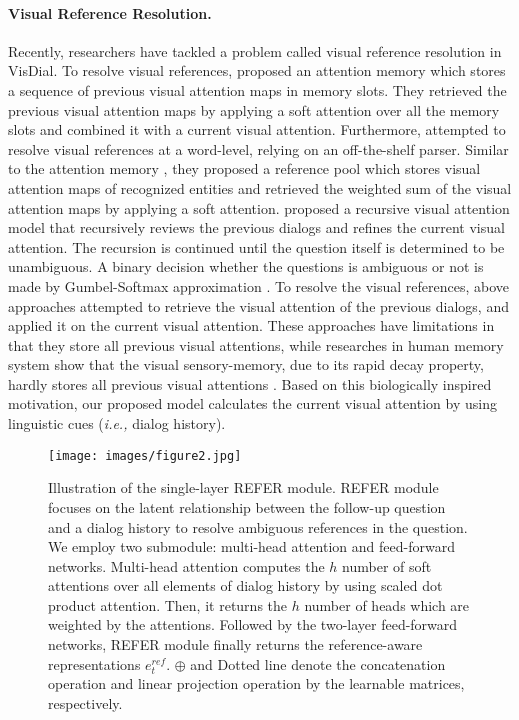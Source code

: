 \documentclass[11pt,a4paper]{article}
\begin{document}
\paragraph{Visual Reference Resolution.} Recently, researchers have tackled a problem called visual reference resolution   \cite{seo2017visual,kottur2018visual,niu2018recursive} in VisDial. To resolve visual references, \cite{seo2017visual} proposed an attention memory which stores a sequence of previous visual attention maps in memory slots. They retrieved the previous visual attention maps by applying a soft attention over all the memory slots and combined it with a current visual attention. Furthermore, \cite{kottur2018visual} attempted to resolve visual references at a word-level, relying on an off-the-shelf parser. Similar to the attention memory \cite{seo2017visual}, they proposed a reference pool which stores visual attention maps of recognized entities and retrieved the weighted sum of the visual attention maps by applying a soft attention. \cite{niu2018recursive} proposed a recursive visual attention model that recursively reviews the previous dialogs and refines the current visual attention. The recursion is continued until the question itself is determined to be unambiguous. A binary decision whether the questions is ambiguous or not is made by Gumbel-Softmax approximation  \cite{jang2016categorical,maddison2016concrete}. To resolve the visual references, above approaches attempted to retrieve the visual attention of the previous dialogs, and applied it on the current visual attention. 
These approaches have limitations in that they store all previous visual attentions, while researches in human memory system show that the visual sensory-memory, due to its rapid decay property, hardly stores all previous visual attentions \cite{sperling1960information,sergent2011top}. Based on this biologically inspired motivation, our proposed model calculates the current visual attention by using linguistic cues ({\it i.e.,} dialog history). 

\begin{figure*}[ht!]
\label{figure:architecture2}
\centering
\texttt{[image: images/figure2.jpg]}
\caption{Illustration of the single-layer REFER module. REFER module focuses on the latent relationship between the follow-up question and a dialog history to resolve ambiguous references in the question. We employ two submodule: multi-head attention and feed-forward networks. Multi-head attention computes the $h$ number of soft attentions over all elements of dialog history by using scaled dot product attention. Then, it returns the $h$ number of heads which are weighted by the attentions. Followed by the two-layer feed-forward networks, REFER module finally returns the reference-aware representations $e^{ref}_t$. $\oplus$ and Dotted line denote the concatenation operation and linear projection operation by the learnable matrices, respectively.}
\end{figure*}
\end{document}
